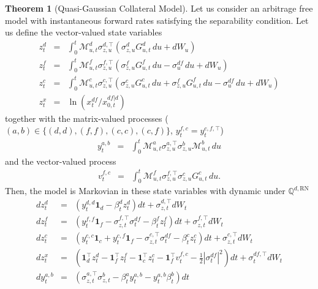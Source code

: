 \documentclass[11pt,english]{amsart}
\newcommand{\vun}{\mathbf{1}}
\newcommand{\RN}{\mathrm{RN}}
\newcommand{\QQ}{\mathbb{Q}}
\theoremstyle{definition}
\newtheorem{theo}{Theorem}
\begin{document}
\begin{theo}[Quasi-Gaussian Collateral Model]\label{theo:qgcm}
Let us consider an arbitrage free model with instantaneous forward rates satisfying the separability condition. Let us define the vector-valued state variables
\begin{eqnarray}
  z^{d}_t &=& \int_0^t \mathcal{M}^d_{u,t} \sigma^{d,\top}_{z,u} \left(  \sigma^{d}_{z,u} G^d_{u,t} \, du + dW_u \right) \\
  z^{f}_t &=& \int_0^t \mathcal{M}^f_{u,t} \sigma^{f,\top}_{z,u} \left(  \sigma^{f}_{z,u} G^f_{u,t} \, du - \sigma^{df}_u \, du + dW_u \right) \\
  z^{c}_t &=& \int_0^t \mathcal{M}^c_{u,t} \sigma^{c,\top}_{z,u} \left(  \sigma^{c}_{z,u} G^c_{u,t} \, du + \sigma^{f}_{z,u} G^f_{u,t} \, du - \sigma^{df}_u \, du + dW_u \right) \\
  z^{x}_t &=& \ln \left( x^{df}_t / x^{df|d}_{0,t} \right)
\end{eqnarray}
together with the matrix-valued processes ($(a,b) \in \{(d,d),(f,f),(c,c),(c,f)\}$, $y^{f,c}_t = y^{c,f,\top}_t$)
\begin{eqnarray}
  y^{a,b}_t &=& \int_0^t \mathcal{M}^a_{u,t} \sigma^{a,\top}_{z,u} \sigma^{b}_{z,u} \mathcal{M}^b_{u,t} \, du
\end{eqnarray}
and the vector-valued process
\begin{eqnarray}
  v^{f,c}_t &=& \int_0^t \mathcal{M}^f_{u,t} \sigma^{f,\top}_{z,u} \sigma^{c}_{z,u} G^c_{u,t} \, du .
\end{eqnarray}
Then, the model is Markovian in these state variables with dynamic under $\QQ^{d,\RN}$
\begin{eqnarray}
  dz^{d}_t &=& \left(y^{d,d}_t\vun_d - \beta^{d}_t z^{d}_t \right)dt +  \sigma^{d,\top}_{z,t} dW_t \\
  dz^{f}_t &=& \left(y^{f,f}_t\vun_f - \sigma^{f,\top}_{z,t}\sigma^{df}_t - \beta^{f}_t z^{f}_t \right)dt +  \sigma^{f,\top}_{z,t} dW_t \\
  dz^{c}_t &=& \left(y^{c,c}_t\vun_c + y^{c,f}_t\vun_f - \sigma^{c,\top}_{z,t}\sigma^{df}_t - \beta^{c}_t z^{c}_t \right)dt +  \sigma^{c,\top}_{z,t} dW_t \\
  dz^{x}_t &=&  \left(\vun_d^\top z^{d}_t - \vun_f^\top z^{f}_t - \vun_c^\top z^{c}_t - \vun_f^\top v^{f,c}_t - \frac{1}{2}|\sigma^{df}_t|^2\right)dt + \sigma^{df,\top}_t dW_t  \\
  dy^{a,b}_t &=&   \left(\sigma^{a,\top}_{z,t} \sigma^{b}_{z,t} - \beta^{a}_t y^{a,b}_t - y^{a,b}_t \beta^{b}_t \right) dt  \\

\end{eqnarray}
\end{theo}
\end{document}
